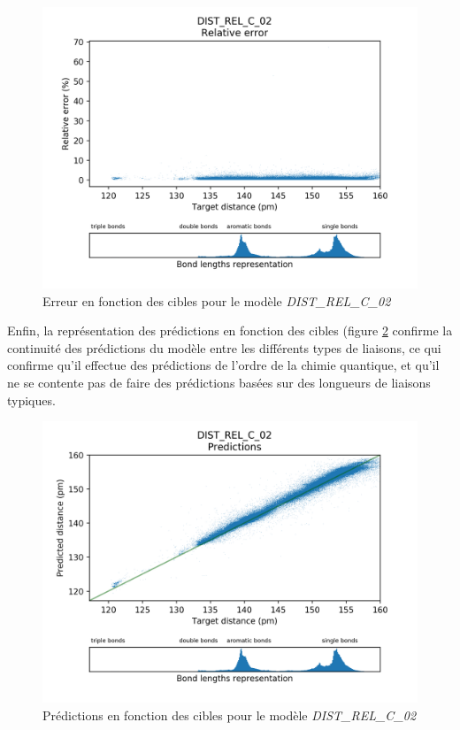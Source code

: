\begin{figure}
	\centering
	
	\includegraphics[scale=0.7]{../figures/DIST_REL_C_02/DIST_REL_C_02_distrib_rmse_dist.png}	
	
	\caption{Erreur en fonction des cibles pour le modèle \emph{DIST\_REL\_C\_02}}
	\label{fdistrib_err_rel_dist_rel_c_02}
	\end{figure}

\par Enfin, la représentation des prédictions en fonction des cibles (figure \ref{fpred_targets_dist_rel_c_02} confirme la continuité des prédictions du modèle entre les différents types de liaisons, ce qui confirme qu'il effectue des prédictions de l'ordre de la chimie quantique, et qu'il ne se contente pas de faire des prédictions basées sur des longueurs de liaisons typiques.

\begin{figure}
	\centering
	
	\includegraphics[scale=0.7]{../figures/DIST_REL_C_02/DIST_REL_C_02_preds_targets.png}	
	
	\caption{Prédictions en fonction des cibles pour le modèle \emph{DIST\_REL\_C\_02}}
	\label{fpred_targets_dist_rel_c_02}
	
\end{figure}

